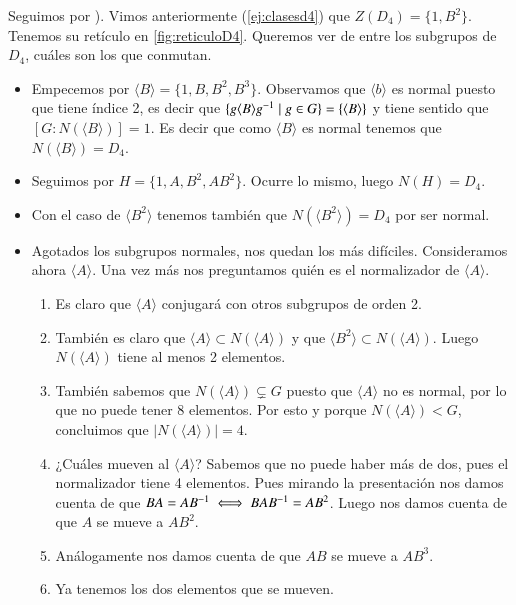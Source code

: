 
\begin{ej}
	Seguimos por ). Vimos anteriormente (\autoref{ej:clasesd4}) que $Z(D_4) = \{1, B^2\}$. Tenemos su retículo en \autoref{fig:reticuloD4}. Queremos ver de entre los subgrupos de $D_4$, cuáles son los que conmutan.
	\begin{itemize}
		\item Empecemos por $\langle B \rangle = \{1, B, B^2, B^3\}$. Observamos que $\langle b \rangle$ es normal puesto que tiene índice 2, es decir que $\{g\langle B \rangle g^{-1} \mid g \in G\} = \{\langle B \rangle\}$ y tiene sentido que $[G:N(\langle B \rangle)] = 1$. Es decir que como $\langle B \rangle$ es normal tenemos que $N(\langle B \rangle) = D_4$.
		\item Seguimos por $H = \{1, A, B^2, AB^2\}$. Ocurre lo mismo, luego $N(H) = D_4$.
		\item Con el caso de $\langle B^2 \rangle$ tenemos también que $N(\langle B^2 \rangle) = D_4$ por ser normal.
		\item Agotados los subgrupos normales, nos quedan los más difíciles. Consideramos ahora $\langle A \rangle$. Una vez más nos preguntamos quién es el normalizador de $\langle A \rangle$.
		\begin{enumerate}
			\item Es claro que $\langle A \rangle$ conjugará con otros subgrupos de orden 2.
			\item También es claro que $\langle A \rangle \subset N(\langle A \rangle)$ y que $\langle B^2 \rangle \subset N(\langle A \rangle)$. Luego $N(\langle A \rangle)$ tiene al menos 2 elementos.
			\item También sabemos que $N(\langle A \rangle) \subsetneq G$ puesto que $\langle A \rangle$ no es normal, por lo que no puede tener 8 elementos. Por esto y porque $N(\langle A \rangle) < G$, concluimos que $|N(\langle A \rangle)| = 4$.
			\item ¿Cuáles mueven al $\langle A \rangle$? Sabemos que no puede haber más de dos, pues el normalizador tiene 4 elementos. Pues mirando la presentación nos damos cuenta de que $BA = AB^{-1} \iff BAB^{-1} = AB^2$. Luego nos damos cuenta de que $A$ se mueve a $AB^2$.
			\item Análogamente nos damos cuenta de que $AB$ se mueve a $AB^3$.
			\item Ya tenemos los dos elementos que se mueven.
		\end{enumerate}
	\end{itemize}
\end{ej}

